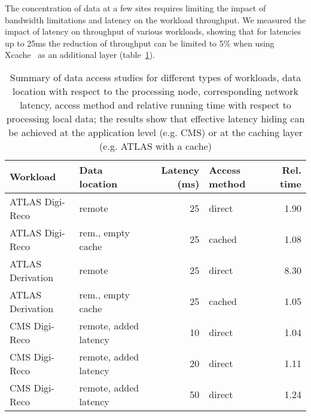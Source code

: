 The concentration of data at a few sites requires limiting the impact
of bandwidth limitations and latency on the workload throughput.  We
measured the impact of latency on throughput of various workloads,
showing that for latencies up to 25ms the reduction of throughput can
be limited to 5\% when using Xcache~\cite{xcache} as an additional layer
(table~\ref{tab:latency}).
\begin{table}
  \centering
  \caption{Summary of data access studies for different types of
    workloads, data location with respect to the processing node,
    corresponding network latency, access method and relative running
    time with respect to processing local data; the results show that
    effective latency hiding can be achieved at the application level
    (e.g. CMS) or at the caching layer (e.g. ATLAS with a cache)}
  \label{tab:latency}
  \begin{tabular}{llrlr}
    \hline
    Workload & Data location & Latency (ms) & Access method & Rel. time \\\hline
    ATLAS Digi-Reco & remote & ~25 & direct & 1.90 \\ 
    ATLAS Digi-Reco & rem., empty cache & ~25 & cached & 1.08 \\ 
    ATLAS Derivation & remote & ~25 & direct & 8.30 \\ 
    ATLAS Derivation & rem., empty cache & ~25 & cached & 1.05 \\ 
    CMS Digi-Reco & remote, added latency& 10 & direct & 1.04 \\
    CMS Digi-Reco & remote, added latency& 20 & direct & 1.11 \\
    CMS Digi-Reco & remote, added latency& 50 & direct & 1.24 \\\hline
  \end{tabular}
\end{table}

